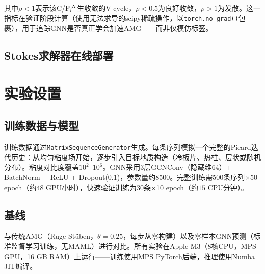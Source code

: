 \documentclass[11pt,a4paper]{ctexart}
\begin{document}
其中$\rho < 1$表示该C/F产生收敛的V-cycle，$\rho < 0.5$为良好收敛，$\rho > 1$为发散。这一指标在验证阶段计算（使用无法求导的scipy稀疏操作，以\texttt{torch.no\_grad()}包裹），用于追踪GNN是否真正学会加速AMG——而非仅模仿标签。

\subsection{Stokes求解器在线部署}

\begin{algorithm}[ht]
\SetAlgoLined
\caption{Meta-AMG在线适配（嵌入Picard迭代）}
\label{alg:deploy}
\end{algorithm}

\section{实验设置}
\label{sec:setup}

\subsection{训练数据与模型}

训练数据通过\texttt{MatrixSequenceGenerator}生成。每条序列模拟一个完整的Picard迭代历史：从均匀粘度场开始，逐步引入目标地质构造（冷板片、热柱、层状或随机分布）。粘度对比度覆盖$10^2$--$10^6$。GNN采用3层GCNConv（隐藏维64）+ BatchNorm + ReLU + Dropout(0.1)，参数量约8500。完整训练需500条序列$\times$50 epoch（约$48$ GPU小时），快速验证训练为30条$\times$10 epoch（约$15$ CPU分钟）。

\subsection{基线}与传统AMG（Ruge-St\"{u}ben，$\theta = 0.25$，每步从零构建）以及零样本GNN预测（标准监督学习训练，无MAML）进行对比。所有实验在Apple M3（8核CPU，MPS GPU，16 GB RAM）上运行——训练使用MPS PyTorch后端，推理使用Numba JIT编译。
\end{document}
